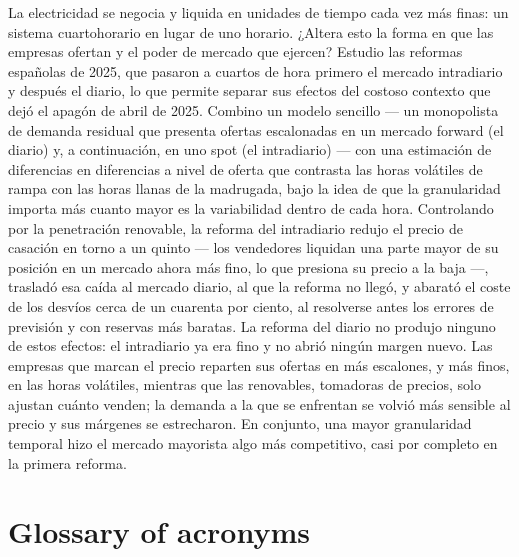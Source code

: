 \documentclass[11pt,a4paper]{article}
\theoremstyle{definition}
\theoremstyle{remark}
\theoremstyle{plain}
\begin{document}
\noindent La electricidad se negocia y liquida en unidades de tiempo cada vez más finas: un sistema cuartohorario en lugar de uno horario. ¿Altera esto la forma en que las empresas ofertan y el poder de mercado que ejercen? Estudio las reformas españolas de 2025, que pasaron a cuartos de hora primero el mercado intradiario y después el diario, lo que permite separar sus efectos del costoso contexto que dejó el apagón de abril de 2025. Combino un modelo sencillo --- un monopolista de demanda residual que presenta ofertas escalonadas en un mercado forward (el diario) y, a continuación, en uno spot (el intradiario) --- con una estimación de diferencias en diferencias a nivel de oferta que contrasta las horas volátiles de rampa con las horas llanas de la madrugada, bajo la idea de que la granularidad importa más cuanto mayor es la variabilidad dentro de cada hora. Controlando por la penetración renovable, la reforma del intradiario redujo el precio de casación en torno a un quinto --- los vendedores liquidan una parte mayor de su posición en un mercado ahora más fino, lo que presiona su precio a la baja ---, trasladó esa caída al mercado diario, al que la reforma no llegó, y abarató el coste de los desvíos cerca de un cuarenta por ciento, al resolverse antes los errores de previsión y con reservas más baratas. La reforma del diario no produjo ninguno de estos efectos: el intradiario ya era fino y no abrió ningún margen nuevo. Las empresas que marcan el precio reparten sus ofertas en más escalones, y más finos, en las horas volátiles, mientras que las renovables, tomadoras de precios, solo ajustan cuánto venden; la demanda a la que se enfrentan se volvió más sensible al precio y sus márgenes se estrecharon. En conjunto, una mayor granularidad temporal hizo el mercado mayorista algo más competitivo, casi por completo en la primera reforma.

\clearpage


{\hypersetup{linkcolor=black}\tableofcontents}
\vspace{50pt}
\section*{Glossary of acronyms}\label{sec:glossary}
\end{document}
